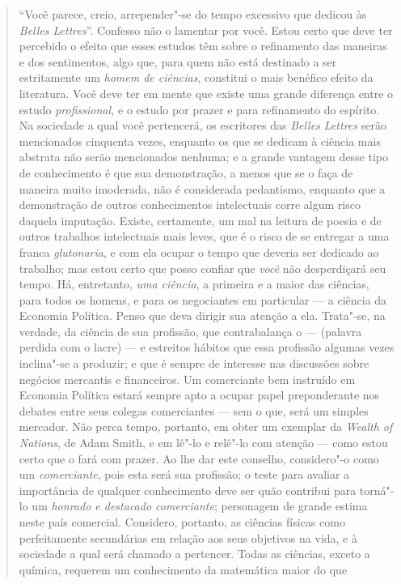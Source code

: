 \begin{quote}
``Você parece, creio, arrepender"-se do tempo excessivo que dedicou às
\textit{Belles Lettres}''. Confesso não o lamentar por você. Estou certo
que deve ter percebido o efeito que esses estudos têm sobre o
refinamento das maneiras e dos sentimentos, algo que, para quem não está
destinado a ser estritamente um \textit{homem de ciências}, constitui o
mais benéfico efeito da literatura. Você deve ter em mente que existe
uma grande diferença entre o estudo \textit{profissional,} e o estudo por
prazer e para refinamento do espírito. Na sociedade a qual você
pertencerá, os escritores das \textit{Belles Lettres} serão mencionados
cinquenta vezes, enquanto os que se dedicam à ciência mais abstrata não
serão mencionados nenhuma; e a grande vantagem desse tipo de
conhecimento é que sua demonstração, a menos que se o faça de maneira
muito imoderada, não é considerada pedantismo, enquanto que a
demonstração de outros conhecimentos intelectuais corre algum risco
daquela imputação. Existe, certamente, um mal na leitura de poesia e de
outros trabalhos intelectuais mais leves, que é o risco de se entregar a
uma franca \textit{glutonaria}, e com ela ocupar o tempo que deveria ser
dedicado ao trabalho; mas estou certo que posso confiar que \textit{você}
não desperdiçará seu tempo. Há, entretanto, \textit{uma ciência}, a
primeira e a maior das ciências, para todos os homens, e para os
negociantes em particular --- a ciência da Economia Política. Penso que
deva dirigir sua atenção a ela. Trata"-se, na verdade, da ciência de sua
profissão, que contrabalança o --- (palavra perdida com o lacre) --- e
estreitos hábitos que essa profissão algumas vezes inclina"-se a
produzir; e que é sempre de interesse nas discussões sobre negócios
mercantis e financeiros. Um comerciante bem instruído em Economia
Política estará sempre apto a ocupar papel preponderante nos debates
entre seus colegas comerciantes --- sem o que, será um simples mercador.
Não perca tempo, portanto, em obter um exemplar da \textit{Wealth of
Nations}, de Adam Smith, e em lê"-lo e relê"-lo com atenção --- como estou
certo que o fará com prazer. Ao lhe dar este conselho, considero"-o como
um \textit{comerciante}, pois esta será sua profissão; o teste para
avaliar a importância de qualquer conhecimento deve ser quão contribui
para torná"-lo um \textit{honrado e destacado comerciante}; personagem de
grande estima neste país comercial. Considero, portanto, as ciências
físicas como perfeitamente secundárias em relação aos seus objetivos na
vida, e à sociedade a qual será chamado a pertencer. Todas as ciências,
exceto a química, requerem um conhecimento da matemática maior do que

\end{quote}
